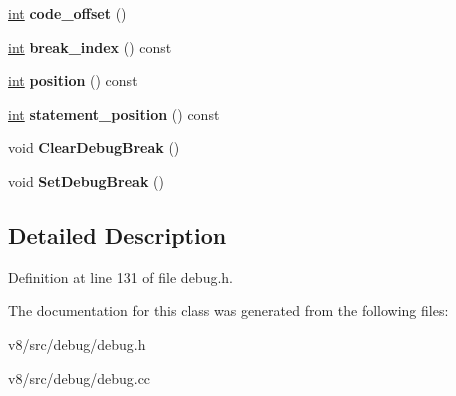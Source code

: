 \begin{DoxyCompactItemize}
\mbox{\hyperlink{classint}{int}} {\bfseries code\+\_\+offset} ()
\item 
\mbox{\label{classv8_1_1internal_1_1BreakIterator_aca4346d61ec2b527ade3b54d2ce6f793}} 
\mbox{\hyperlink{classint}{int}} {\bfseries break\+\_\+index} () const
\item 
\mbox{\label{classv8_1_1internal_1_1BreakIterator_a1febec545cac726bb658c08791ea4c59}} 
\mbox{\hyperlink{classint}{int}} {\bfseries position} () const
\item 
\mbox{\label{classv8_1_1internal_1_1BreakIterator_ab5d415ab8dac806de7f6627e0a5aab2d}} 
\mbox{\hyperlink{classint}{int}} {\bfseries statement\+\_\+position} () const
\item 
\mbox{\label{classv8_1_1internal_1_1BreakIterator_a2189db30a7e9ce3901bc74b3ac05befa}} 
void {\bfseries Clear\+Debug\+Break} ()
\item 
\mbox{\label{classv8_1_1internal_1_1BreakIterator_a02fe2dd87d076830b498642bc880e153}} 
void {\bfseries Set\+Debug\+Break} ()
\end{DoxyCompactItemize}


\subsection{Detailed Description}


Definition at line 131 of file debug.\+h.



The documentation for this class was generated from the following files\+:\begin{DoxyCompactItemize}
\item 
v8/src/debug/debug.\+h\item 
v8/src/debug/debug.\+cc\end{DoxyCompactItemize}
